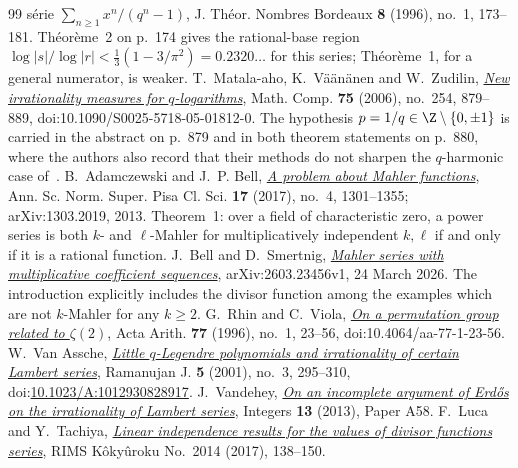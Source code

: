 \begin{thebibliography}{99}
{{  s\'erie $\sum_{n\ge1}x^{n}/(q^{n}-1)$}},
  J. Th\'eor. Nombres Bordeaux \textbf{8} (1996), no.~1, 173--181.
  Th\'eor\`eme~2 on p.~174 gives the rational-base region
  $\log|s|/\log|r|<\frac13(1-3/\pi^{2})=0.2320\ldots$ for this series;
  Th\'eor\`eme~1, for a general numerator, is weaker.
 T.~Matala-aho, K.~V\"a\"an\"anen and W.~Zudilin,
  \href{https://doi.org/10.1090/S0025-5718-05-01812-0}{\emph{New irrationality
  measures for \(q\)-logarithms}}, Math. Comp. \textbf{75} (2006), no.~254,
  879--889, doi:10.1090/S0025-5718-05-01812-0.  The hypothesis
  \(p=1/q\in\Z\mathbin{\backslash}\{0,\pm1\}\) is carried in the abstract on p.~879 and in
  both theorem statements on p.~880, where the authors also record that their
  methods do not sharpen the \(q\)-harmonic case of~\cite{zudilin2004}.
 B.~Adamczewski and J.~P. Bell,
  \href{https://arxiv.org/abs/1303.2019}{\emph{A problem about Mahler
  functions}}, Ann. Sc. Norm. Super. Pisa Cl. Sci. \textbf{17} (2017), no.~4,
  1301--1355; arXiv:1303.2019, 2013.  Theorem~1: over a field of characteristic
  zero, a power series is both \(k\)- and \(\ell\)-Mahler for multiplicatively
  independent \(k,\ell\) if and only if it is a rational function.
 J.~Bell and D.~Smertnig,
  \href{https://arxiv.org/abs/2603.23456}{\emph{Mahler series with
  multiplicative coefficient sequences}}, arXiv:2603.23456v1,
  24 March 2026.  The introduction explicitly includes the divisor function
  among the examples which are not \(k\)-Mahler for any \(k\ge2\).
 G.~Rhin and C.~Viola,
  \href{https://geodesic.mathdoc.fr/articles/10.4064/aa-77-1-23-56/}
  {\emph{On a permutation group related to $\zeta(2)$}},
  Acta Arith. \textbf{77} (1996), no.~1, 23--56,
  doi:10.4064/aa-77-1-23-56.
 W.~Van Assche,
  \href{https://arxiv.org/abs/math/0101187}{\emph{Little \(q\)-Legendre
  polynomials and irrationality of certain Lambert series}},
  Ramanujan J. \textbf{5} (2001), no.~3, 295--310,
  doi:\href{https://doi.org/10.1023/A:1012930828917}{10.1023/A:1012930828917}.
 J.~Vandehey,
  \href{https://arxiv.org/abs/1206.0340}{\emph{On an incomplete argument of
  Erd\H{o}s on the irrationality of Lambert series}},
  Integers \textbf{13} (2013), Paper A58.
 F.~Luca and Y.~Tachiya,
  \href{https://www.kurims.kyoto-u.ac.jp/~kyodo/kokyuroku/contents/pdf/2014-14.pdf}
  {\emph{Linear independence results for the values of divisor functions
  series}}, RIMS K\^oky\^uroku No.~2014 (2017), 138--150.

\end{thebibliography}
